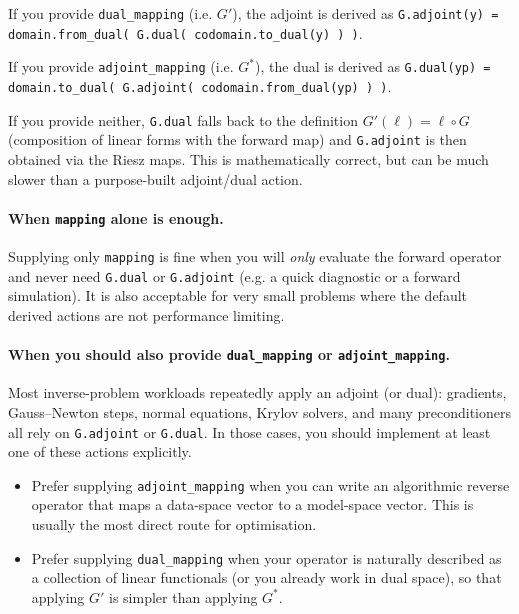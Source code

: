 \documentclass[11pt,twoside,openright]{book}
\theoremstyle{plain}
\theoremstyle{definition}
\theoremstyle{remark}
\begin{document}
\begin{codebox}
If you provide \texttt{dual\_mapping} (i.e. $G'$), the adjoint is derived as
\texttt{G.adjoint(y) = domain.from\_dual( G.dual( codomain.to\_dual(y) ) )}.

If you provide \texttt{adjoint\_mapping} (i.e. $G^*$), the dual is derived as
\texttt{G.dual(yp) = domain.to\_dual( G.adjoint( codomain.from\_dual(yp) ) )}.
\end{codebox}

If you provide neither, \texttt{G.dual} falls back to the definition
$G'(\ell)=\ell\circ G$ (composition of linear forms with the forward map) and
\texttt{G.adjoint} is then obtained via the Riesz maps. This is mathematically
correct, but can be much slower than a purpose-built adjoint/dual action.

\paragraph{When \texttt{mapping} alone is enough.}
Supplying only \texttt{mapping} is fine when you will \emph{only} evaluate the
forward operator and never need \texttt{G.dual} or \texttt{G.adjoint}
(e.g. a quick diagnostic or a forward simulation). It is also acceptable for
very small problems where the default derived actions are not performance
limiting.

\paragraph{When you should also provide \texttt{dual\_mapping} or \texttt{adjoint\_mapping}.}
Most inverse-problem workloads repeatedly apply an adjoint (or dual): gradients,
Gauss--Newton steps, normal equations, Krylov solvers, and many preconditioners
all rely on \texttt{G.adjoint} or \texttt{G.dual}. In those cases, you should
implement at least one of these actions explicitly.
\begin{itemize}
  \item Prefer supplying \texttt{adjoint\_mapping} when you can write an
    algorithmic reverse operator that maps a data-space vector to a model-space
    vector. This is usually the most direct route for optimisation.
  \item Prefer supplying \texttt{dual\_mapping} when your operator is naturally
    described as a collection of linear functionals (or you already work in
    dual space), so that applying $G'$ is simpler than applying $G^*$.
\end{itemize}
\end{document}
